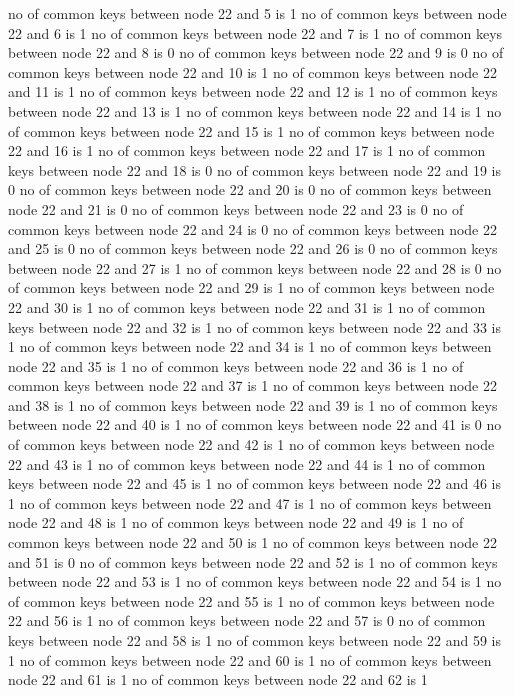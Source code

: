 no of common keys between node 22 and 5 is 1
no of common keys between node 22 and 6 is 1
no of common keys between node 22 and 7 is 1
no of common keys between node 22 and 8 is 0
no of common keys between node 22 and 9 is 0
no of common keys between node 22 and 10 is 1
no of common keys between node 22 and 11 is 1
no of common keys between node 22 and 12 is 1
no of common keys between node 22 and 13 is 1
no of common keys between node 22 and 14 is 1
no of common keys between node 22 and 15 is 1
no of common keys between node 22 and 16 is 1
no of common keys between node 22 and 17 is 1
no of common keys between node 22 and 18 is 0
no of common keys between node 22 and 19 is 0
no of common keys between node 22 and 20 is 0
no of common keys between node 22 and 21 is 0
no of common keys between node 22 and 23 is 0
no of common keys between node 22 and 24 is 0
no of common keys between node 22 and 25 is 0
no of common keys between node 22 and 26 is 0
no of common keys between node 22 and 27 is 1
no of common keys between node 22 and 28 is 0
no of common keys between node 22 and 29 is 1
no of common keys between node 22 and 30 is 1
no of common keys between node 22 and 31 is 1
no of common keys between node 22 and 32 is 1
no of common keys between node 22 and 33 is 1
no of common keys between node 22 and 34 is 1
no of common keys between node 22 and 35 is 1
no of common keys between node 22 and 36 is 1
no of common keys between node 22 and 37 is 1
no of common keys between node 22 and 38 is 1
no of common keys between node 22 and 39 is 1
no of common keys between node 22 and 40 is 1
no of common keys between node 22 and 41 is 0
no of common keys between node 22 and 42 is 1
no of common keys between node 22 and 43 is 1
no of common keys between node 22 and 44 is 1
no of common keys between node 22 and 45 is 1
no of common keys between node 22 and 46 is 1
no of common keys between node 22 and 47 is 1
no of common keys between node 22 and 48 is 1
no of common keys between node 22 and 49 is 1
no of common keys between node 22 and 50 is 1
no of common keys between node 22 and 51 is 0
no of common keys between node 22 and 52 is 1
no of common keys between node 22 and 53 is 1
no of common keys between node 22 and 54 is 1
no of common keys between node 22 and 55 is 1
no of common keys between node 22 and 56 is 1
no of common keys between node 22 and 57 is 0
no of common keys between node 22 and 58 is 1
no of common keys between node 22 and 59 is 1
no of common keys between node 22 and 60 is 1
no of common keys between node 22 and 61 is 1
no of common keys between node 22 and 62 is 1
